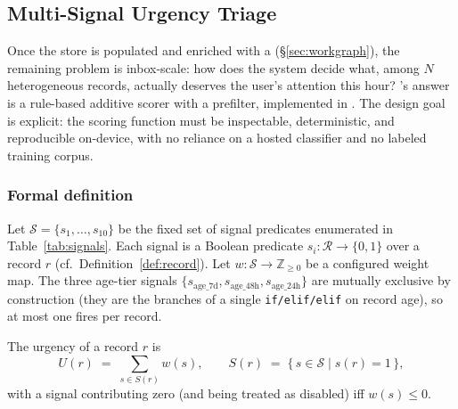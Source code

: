 
\subsection{Multi-Signal Urgency Triage}
\label{sec:urgency}

Once the store is populated and enriched with a \WorkGraph{} (\S\ref{sec:workgraph}),
the remaining problem is inbox-scale: how does the system decide what,
among $N$ heterogeneous records, actually deserves the user's attention
this hour?  \coviber{}'s answer is a rule-based additive scorer with a
prefilter, implemented in . The design goal is
explicit: the scoring function must be inspectable, deterministic, and
reproducible on-device, with no reliance on a hosted classifier and no
labeled training corpus.

\subsubsection{Formal definition}

Let $\mathcal{S} = \{s_1, \ldots, s_{10}\}$ be the fixed set of signal
predicates enumerated in Table~\ref{tab:signals}. Each signal is a
Boolean predicate $s_i : \mathcal{R} \to \{0,1\}$ over a record $r$
(cf.\ Definition~\ref{def:record}). Let $w : \mathcal{S} \to
\mathbb{Z}_{\ge 0}$ be a configured weight map. The three age-tier
signals $\{s_{\text{age\_7d}}, s_{\text{age\_48h}}, s_{\text{age\_24h}}\}$
are mutually exclusive by construction (they are the branches of a
single \texttt{if/elif/elif} on record age), so at most one fires per
record.

\begin{definition}
\label{def:urgency}
The urgency of a record $r$ is
\[
U(r) \;=\; \sum_{s \in S(r)} w(s), \qquad
S(r) \;=\; \{\, s \in \mathcal{S} \mid s(r) = 1 \,\},
\]
with a signal contributing zero (and being treated as disabled) iff
$w(s) \le 0$.
\end{definition}

